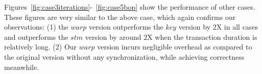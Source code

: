 Figures~\ref{fig:case3iterations}-~\ref{fig:case5bop} show the performance of other cases. These figures are very similar to the above case, which again confirms our observations: (1)  the $warp$ version outperforms the $key$ version by 2X in all cases and outperforms the $stm$ version by around 2X when the transaction duration is relatively long. (2) Our $warp$ version incurs negligible overhead as compared to the original version without any synchronization, while achieving correctness meanwhile.






 


\begin{figure}
\centering
{}
\\

\end{figure}
